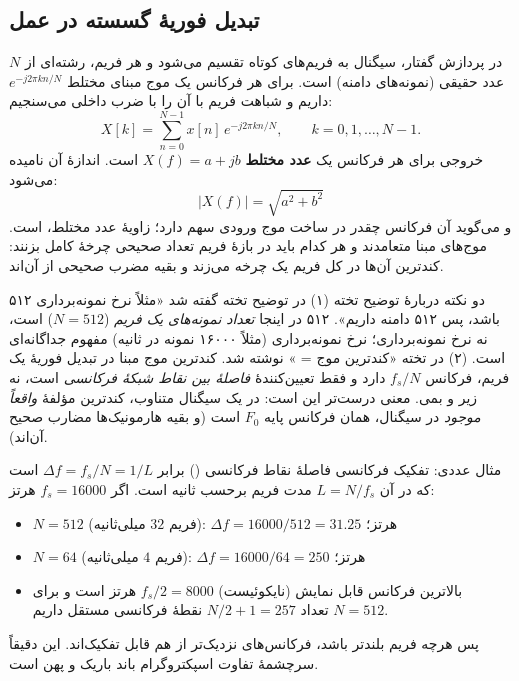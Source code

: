 \subsection{تبدیل فوریهٔ گسسته در عمل}
در پردازش گفتار، سیگنال به فریم‌های کوتاه تقسیم می‌شود و هر فریم، رشته‌ای از $N$ عدد حقیقی (نمونه‌های دامنه) است. برای هر فرکانس یک موج مبنای مختلط $e^{-j2\pi kn/N}$ داریم و شباهت فریم با آن را با ضرب داخلی می‌سنجیم:
\[
X[k]=\sum_{n=0}^{N-1}x[n]\,e^{-j2\pi kn/N},\qquad k=0,1,\dots,N-1.
\]
خروجی برای هر فرکانس یک \textbf{عدد مختلط} $X(f)=a+jb$ است. اندازهٔ آن  نامیده می‌شود:
\[
\left|X(f)\right|=\sqrt{a^2+b^2}
\]
و می‌گوید آن فرکانس چقدر در ساخت موج ورودی سهم دارد؛ زاویهٔ عدد مختلط،  است. موج‌های مبنا متعامدند و هر کدام باید در بازهٔ فریم تعداد صحیحی چرخهٔ کامل بزنند: کندترین آن‌ها در کل فریم یک چرخه می‌زند و بقیه مضرب صحیحی از آن‌اند.

\begin{correctionbox}{دو نکته دربارهٔ توضیح تخته}
(۱) در توضیح تخته گفته شد «مثلاً نرخ نمونه‌برداری ۵۱۲ باشد، پس ۵۱۲ دامنه داریم». ۵۱۲ در اینجا \emph{تعداد نمونه‌های یک فریم} ($N=512$) است، نه نرخ نمونه‌برداری؛ نرخ نمونه‌برداری (مثلاً ۱۶۰۰۰ نمونه در ثانیه) مفهوم جداگانه‌ای است. (۲) در تخته «کندترین موج = » نوشته شد. کندترین موج مبنا در تبدیل فوریهٔ یک فریم، فرکانس $f_s/N$ دارد و فقط تعیین‌کنندهٔ \emph{فاصلهٔ بین نقاط شبکهٔ فرکانسی} است، نه زیر و بمی. معنی درست‌تر این است: در یک سیگنال متناوب، کندترین مؤلفهٔ \emph{واقعاً موجود} در سیگنال، همان فرکانس پایه $F_0$ است (و بقیه هارمونیک‌ها مضارب صحیح آن‌اند).
\end{correctionbox}

\begin{addedbox}{مثال عددی: تفکیک فرکانسی }
فاصلهٔ نقاط فرکانسی () برابر $\Delta f=f_s/N=1/L$ است که در آن $L=N/f_s$ مدت فریم برحسب ثانیه است. اگر $f_s=16000$ هرتز:
\begin{itemize}
  \item $N=512$ (فریم $32$ میلی‌ثانیه): $\Delta f=16000/512=31.25$ هرتز؛
  \item $N=64$ (فریم $4$ میلی‌ثانیه): $\Delta f=16000/64=250$ هرتز؛
  \item بالاترین فرکانس قابل نمایش (نایکوئیست) $f_s/2=8000$ هرتز است و برای $N=512$ تعداد $N/2+1=257$ نقطهٔ فرکانسی مستقل داریم.
\end{itemize}
پس هرچه فریم بلندتر باشد، فرکانس‌های نزدیک‌تر از هم قابل تفکیک‌اند. این دقیقاً سرچشمهٔ تفاوت اسپکتروگرام باند باریک و پهن است.
\end{addedbox}

